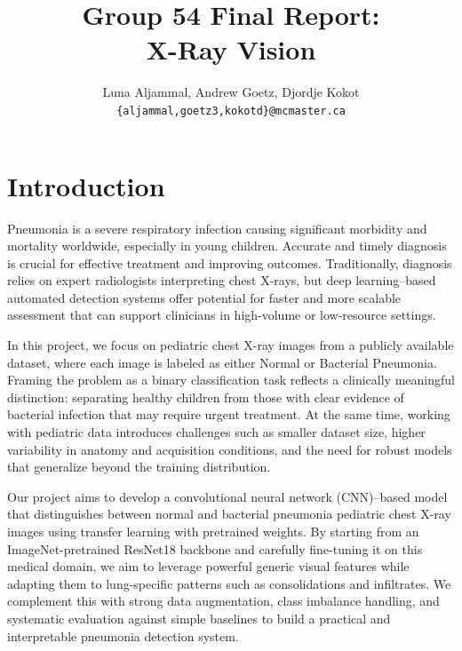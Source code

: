 \documentclass[11pt]{article}
\title{Group 54 Final Report:\\X-Ray Vision}
\author{Luna Aljammal, Andrew Goetz, Djordje Kokot \\
  \texttt{\{aljammal,goetz3,kokotd\}@mcmaster.ca} }
\begin{document}
\maketitle

\section{Introduction}

Pneumonia is a severe respiratory infection causing significant morbidity and mortality worldwide, especially in young children. Accurate and timely diagnosis is crucial for effective treatment and 
improving outcomes. Traditionally, diagnosis relies on expert radiologists interpreting chest X-rays, but deep learning–based automated detection systems offer potential for faster and more scalable assessment that can support clinicians in high-volume or low-resource settings.

In this project, we focus on pediatric chest X-ray images from a publicly available dataset, where each image is labeled as either Normal or Bacterial Pneumonia. Framing the problem as a binary classification task reflects a clinically meaningful distinction: separating healthy children from those with clear evidence of bacterial infection that may require urgent treatment. At the same time, working with pediatric data introduces challenges such as smaller dataset size, higher variability in anatomy and acquisition conditions, and the need for robust models that generalize beyond the training distribution.

Our project aims to develop a convolutional neural network (CNN)–based model that distinguishes between normal and bacterial pneumonia pediatric chest X-ray images using transfer learning with pretrained weights. By starting from an ImageNet-pretrained ResNet18 backbone and carefully fine-tuning it on this medical domain, we aim to leverage powerful generic visual features while adapting them to lung-specific patterns such as consolidations and infiltrates. We complement this with strong data augmentation, class imbalance handling, and systematic evaluation against simple baselines to build a practical and interpretable pneumonia detection system.
\end{document}
